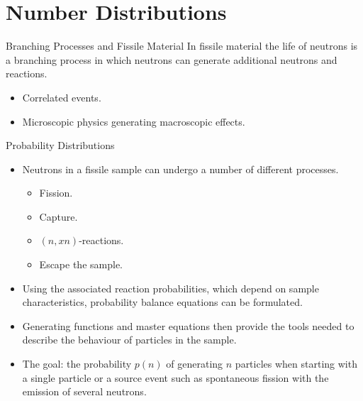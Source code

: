 \documentclass[clock,style=horatio,paper=screen,blackslide,trans=Wipe,mode=present]{powerdot}
\begin{document}
\section[slide=false]{Number Distributions}

\begin{slide}{Branching Processes and Fissile Material}
In fissile material the life of neutrons is a branching process in
which neutrons can generate additional neutrons and reactions.
\begin{itemize}
    \item Correlated events.
    \item Microscopic physics generating macroscopic effects.
\end{itemize} \vspace{-3mm}
\centering
\begin{figure}[ht]
\end{figure}

\end{slide}


\begin{slide}{Probability Distributions}
\vspace{-1mm}
\begin{itemize}
\item Neutrons in a fissile sample can undergo a number of
    different processes.
\begin{itemize}
\item Fission.

\item Capture.

\item $(n,x n)$-reactions.

 \item Escape the sample.
\end{itemize}
\item Using the associated reaction probabilities, which depend on
    sample characteristics, probability balance equations can be
    formulated.

\item Generating functions and master equations then provide the
    tools needed to describe the behaviour of particles in the
    sample.

\item The goal: the probability $p(n)$ of generating $n$
    particles when starting with a single particle or a source
    event such as spontaneous fission with the emission of
    several neutrons.
\end{itemize}
\end{slide}
\end{document}
